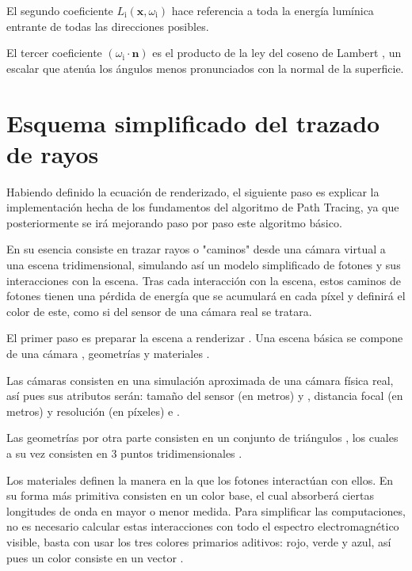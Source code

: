 El segundo coeficiente $L_{\text{i}}(\mathbf {x} ,\omega _{\text{i}})$ hace referencia a toda la energía lumínica entrante de todas las direcciones posibles.

El tercer coeficiente $(\omega _{\text{i}}\cdot \mathbf {n})$ es el producto de la ley del coseno de Lambert \cite{photometria}, un escalar que atenúa los ángulos menos pronunciados con la normal de la superficie.


	\section{Esquema simplificado del trazado de rayos}
	
Habiendo definido la ecuación de renderizado, el siguiente paso es explicar la implementación hecha de los fundamentos del algoritmo de Path Tracing, ya que posteriormente se irá mejorando paso por paso este algoritmo básico.

En su esencia consiste en trazar rayos o "caminos" desde una cámara virtual a una escena tridimensional, simulando así un modelo simplificado de fotones y sus interacciones con la escena. Tras cada interacción con la escena, estos caminos de fotones tienen una pérdida de energía que se acumulará en cada píxel y definirá el color de este, como si del sensor de una cámara real se tratara.

El primer paso es preparar la escena a renderizar . Una escena básica se compone de una cámara , geometrías  y materiales .

Las cámaras  consisten en una simulación aproximada de una cámara física real, así pues sus atributos serán: tamaño del sensor (en metros)  y , distancia focal (en metros)  y resolución (en píxeles)  e . 

Las geometrías  por otra parte consisten en un conjunto de triángulos , los cuales a su vez consisten en 3 puntos tridimensionales .

Los materiales  definen la manera en la que los fotones interactúan con ellos. En su forma más primitiva consisten en un color base, el cual absorberá ciertas longitudes de onda en mayor o menor medida. Para simplificar las computaciones, no es necesario calcular estas interacciones con todo el espectro electromagnético visible, basta con usar los tres colores primarios aditivos: rojo, verde y azul, así pues un color consiste en un vector .

